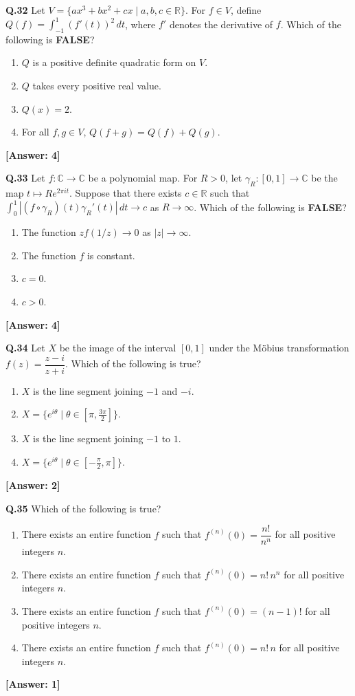 \documentclass[12pt,a4paper]{article}
\newcommand{\ans}[1]{\quad\textcolor{anscolor}{\textbf{[Answer: #1]}}}
\begin{document}
\textbf{Q.32} Let $V=\{ax^3+bx^2+cx\mid a,b,c\in\mathbb{R}\}$. For $f\in V$, define $Q(f)=\int_{-1}^1(f'(t))^2\,dt$, where $f'$ denotes the derivative of $f$. Which of the following is \textbf{FALSE}?
\begin{enumerate}[label=\arabic*.]
\item $Q$ is a positive definite quadratic form on $V$.
\item $Q$ takes every positive real value.
\item $Q(x)=2$.
\item For all $f,g\in V$, $Q(f+g)=Q(f)+Q(g)$.
\end{enumerate}\ans{4}

\textbf{Q.33} Let $f:\mathbb{C}\to\mathbb{C}$ be a polynomial map. For $R>0$, let $\gamma_R:[0,1]\to\mathbb{C}$ be the map $t\mapsto Re^{2\pi it}$. Suppose that there exists $c\in\mathbb{R}$ such that $\int_0^1|(f\circ\gamma_R)(t)\gamma_R'(t)|\,dt\to c$ as $R\to\infty$. Which of the following is \textbf{FALSE}?
\begin{enumerate}[label=\arabic*.]
\item The function $zf(1/z)\to0$ as $|z|\to\infty$.
\item The function $f$ is constant.
\item $c=0$.
\item $c>0$.
\end{enumerate}\ans{4}

\textbf{Q.34} Let $X$ be the image of the interval $[0,1]$ under the M\"{o}bius transformation $f(z)=\dfrac{z-i}{z+i}$. Which of the following is true?
\begin{enumerate}[label=\arabic*.]
\item $X$ is the line segment joining $-1$ and $-i$.
\item $X=\{e^{i\theta}\mid\theta\in[\pi,\tfrac{3\pi}{2}]\}$.
\item $X$ is the line segment joining $-1$ to $1$.
\item $X=\{e^{i\theta}\mid\theta\in[-\tfrac{\pi}{2},\pi]\}$.
\end{enumerate}\ans{2}

\textbf{Q.35} Which of the following is true?
\begin{enumerate}[label=\arabic*.]
\item There exists an entire function $f$ such that $f^{(n)}(0)=\dfrac{n!}{n^n}$ for all positive integers $n$.
\item There exists an entire function $f$ such that $f^{(n)}(0)=n!\,n^n$ for all positive integers $n$.
\item There exists an entire function $f$ such that $f^{(n)}(0)=(n-1)!$ for all positive integers $n$.
\item There exists an entire function $f$ such that $f^{(n)}(0)=n!\,n$ for all positive integers $n$.
\end{enumerate}\ans{1}
\end{document}
